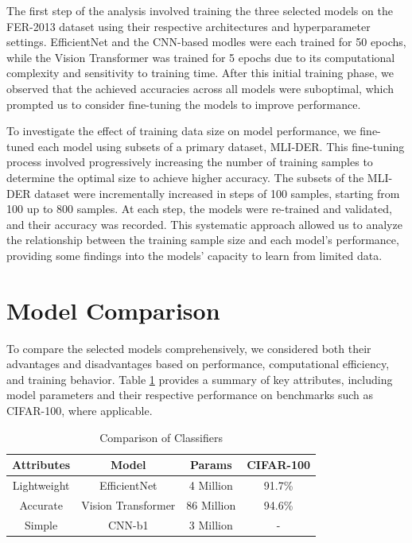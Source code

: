 \documentclass[sigconf]{acmart}
\begin{document}
The first step of the analysis involved training the three selected models on the FER-2013 dataset using their respective architectures and hyperparameter settings. EfficientNet and the CNN-based modles were each trained for 50 epochs, while the Vision Transformer was trained for 5 epochs due to its computational complexity and sensitivity to training time. After this initial training phase, we observed that the achieved accuracies across all models were suboptimal, which prompted us to consider fine-tuning the models to improve performance.

To investigate the effect of training data size on model performance, we fine-tuned each model using subsets of a primary  dataset, MLI-DER. This fine-tuning process involved progressively increasing the number of training samples to determine the optimal size to achieve higher accuracy. The subsets of the MLI-DER dataset were incrementally increased in steps of 100 samples, starting from 100 up to 800 samples. At each step, the models were re-trained and validated, and their accuracy was recorded. This systematic approach allowed us to analyze the relationship between the training sample size and each model's performance, providing some findings into the models' capacity to learn from limited data.

\section{Model Comparison}

To compare the selected models comprehensively, we considered both their advantages and disadvantages based on performance, computational efficiency, and training behavior. Table \ref{tab:classifiers} provides a summary of key attributes, including model parameters and their respective performance on benchmarks such as CIFAR-100, where applicable.

\begin{table}[h]
  \caption{Comparison of Classifiers}
  \label{tab:classifiers}
  \centering
  \begin{tabular}{|c|c|c|c|}
    \hline
    \textbf{Attributes} & \textbf{Model} & \textbf{Params} & \textbf{CIFAR-100} \\
    \hline
    Lightweight & EfficientNet & 4 Million & 91.7\% \\
    \hline
    Accurate & Vision Transformer & 86 Million & 94.6\% \\
    \hline
    Simple & CNN-b1 & 3 Million & - \\
    \hline
  \end{tabular}
\end{table}
\end{document}
